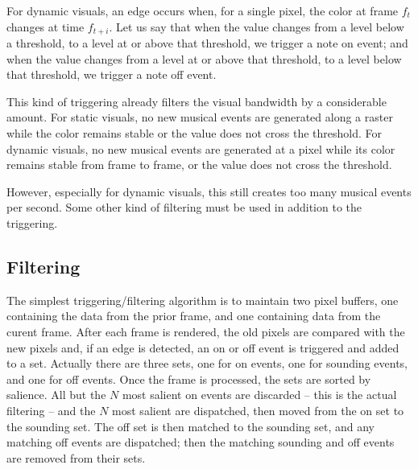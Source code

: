 \documentclass[english,11pt,letterpaper,onecolumn]{scrartcl}
\begin{document}
For dynamic visuals, an edge occurs when, for a single pixel, the color at 
frame $f_{t}$ changes at time $f_{t+i}$. Let us say that when the value 
changes from a level below a threshold, to a level at or above that threshold, 
we trigger a note on event; and when the value changes from a level at or 
above that threshold, to a level below that threshold, we trigger a note off 
event.

This kind of triggering already filters the visual bandwidth by a considerable 
amount. For static visuals, no new musical events are generated along a raster 
while the color remains stable or the value does not cross the threshold. For 
dynamic visuals, no new musical events are generated at a pixel while its 
color remains stable from frame to frame, or the value does not cross the 
threshold.

However, especially for dynamic visuals, this still creates too many musical 
events per second. Some other kind of filtering must be used in addition to 
the triggering.

\subsection{Filtering}

The simplest triggering/filtering algorithm is to maintain two pixel buffers, 
one containing the data from the prior frame, and one containing data from the 
curent frame. After each frame is rendered, the old pixels are compared with 
the new pixels and, if an edge is detected, an on or off event is triggered 
and added to a set. Actually there are three sets, one for on events, one for 
sounding events, and one for off events. Once the frame is processed, the sets 
are sorted by salience. All but the $N$ most salient on events are discarded 
-- this is the actual filtering -- and the $N$ most salient are dispatched, 
then moved from the on set to the sounding set. The off set is then matched to 
the sounding set, and any matching off events are dispatched; then the 
matching sounding and off events are removed from their sets.
\end{document}
